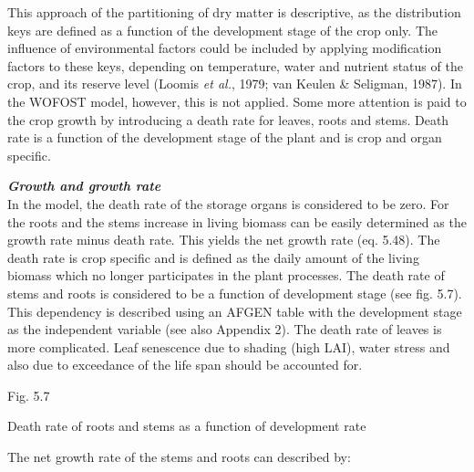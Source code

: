 \documentclass[11pt]{article}
\newcommand{\FigDir}{.}
\begin{document}
This approach of the partitioning of dry mat\-ter is descriptive, as the distribution keys are
defined as a function of the development stage of the crop only. The influence of
environmental factors could be included by applying modification factors to these keys,
depending on temperature, water and nutrient status of the crop, and its reserve level
(Loomis {\it et al.\/}, 1979; van Keulen \& Seligman, 1987). In the WOFOST model, however,
this is not applied. Some more attention is paid to the crop growth by introducing a death
rate for leaves, roots and stems. Death rate is a function of the development stage of the
plant and is crop and organ specific.

\bigskip
\bigskip
{\bf {\it Growth and growth rate\/}}\\
In the model, the death rate of the storage organs is considered to be zero. For the roots
and the stems increase in living biomass can be easily determined as the growth rate
minus death rate. This yields the net growth rate (eq. 5.48). The death rate is crop
specific and is defined as the daily amount of the living biomass which no longer
participates in the plant processes. The death rate of stems and roots is considered to be a
function of development stage (see fig. 5.7). This dependency is described using an
AFGEN table with the development stage as the independent variable (see also Appendix
2). The death rate of leaves is more complicat\-ed. Leaf senescence due to shading (high
LAI), water stress and also due to exceedance of the life span should be accounted for.

\bigskip
\bigskip
\bigskip
\bigskip
\bigskip
\bigskip
 \begin{figure}[htbp]
\begin{forcewidth}{10.05cm}
 \begin{center}\InputPS{\FigDir/RDRRTB.eps} \end{center}
\end{forcewidth}
\end{figure}

\bigskip
\bigskip
\bigskip
\bigskip
\bigskip
\bigskip
\bigskip
\bigskip
\bigskip
\bigskip
\bigskip
\bigskip
\bigskip
Fig. 5.7
\testlastline

\begin{indenting}{2.54cm}
Death rate of roots and stems as a function of development rate
\end{indenting}

\bigskip
\bigskip
The net {\nobreak}growth rate of the stems and roots can described by:
\end{document}
